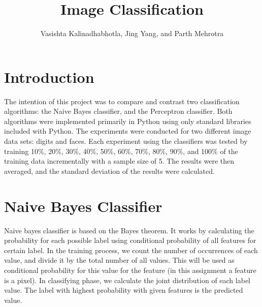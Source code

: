 \documentclass[12pt, letterpaper]{article}
\title{Image Classification}
\author{
  Vasishta Kalinadhabhotla, Jing Yang, and Parth Mehrotra
}
\begin{document}
\maketitle
\section{Introduction}
  The intention of this project was to compare and contrast two classification algorithms: the Naive Bayes classifier, and the Perceptron classifier. Both algorithms were implemented primarily in Python using only standard libraries included with Python. The experiments were conducted for two different image data sets: digits and faces. Each experiment using the classifiers was tested by training 10\%, 20\%, 30\%, 40\%, 50\%, 60\%, 70\%, 80\%, 90\%, and 100\% of the training data incrementally with a sample size of 5. The results were then averaged, and the standard deviation of the results were calculated. \\ 
\section{Naive Bayes Classifier}
  Naive bayes classifier is based on the Bayes theorem. It works by calculating the probability for each possible label using conditional probability of all features for certain label. In the training process, we count the number of occurrences of each value, and divide it by the total number of all values. This will be used as conditional probability for this value for the feature (in this assignment a feature is a pixel). In classifying phase, we calculate the joint distribution of each label value. The label with highest probability with given features is the predicted value. \\ 
\end{document}

